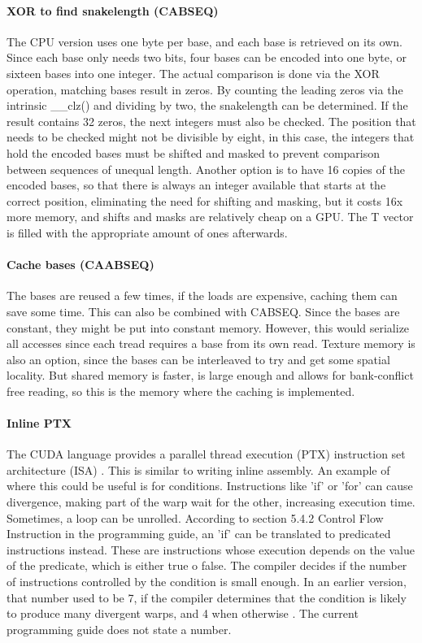 \documentclass[../main/thesis.tex]{subfiles}
\begin{document}
\paragraph{XOR to find snakelength (CABSEQ)}
The CPU version uses one byte per base, and each base is retrieved on its own.
Since each base only needs two bits, four bases can be encoded into one byte, or sixteen bases into one integer.
The actual comparison is done via the XOR operation, matching bases result in zeros.
By counting the leading zeros via the intrinsic \_\_clz() \cite{CUDA_math} and dividing by two, the snakelength can be determined.
If the result contains 32 zeros, the next integers must also be checked.
The position that needs to be checked might not be divisible by eight, in this case, the integers that hold the encoded bases must be shifted and masked to prevent comparison between sequences of unequal length.
Another option is to have 16 copies of the encoded bases, so that there is always an integer available that starts at the correct position, eliminating the need for shifting and masking, but it costs 16x more memory, and shifts and masks are relatively cheap on a GPU.
The T vector is filled with the appropriate amount of ones afterwards.

\paragraph{Cache bases (CAABSEQ)}
The bases are reused a few times, if the loads are expensive, caching them can save some time.
This can also be combined with CABSEQ.
Since the bases are constant, they might be put into constant memory.
However, this would serialize all accesses since each tread requires a base from its own read.
Texture memory is also an option, since the bases can be interleaved to try and get some spatial locality.
But shared memory is faster, is large enough and allows for bank-conflict free reading, so this is the memory where the caching is implemented.


\paragraph{Inline PTX}
The CUDA language provides a parallel thread execution (PTX) instruction set architecture (ISA) \cite{PTX1}\cite{PTX2}.
This is similar to writing inline assembly.
An example of where this could be useful is for conditions.
Instructions like 'if' or 'for' can cause divergence, making part of the warp wait for the other, increasing execution time.
Sometimes, a loop can be unrolled.
According to section 5.4.2 Control Flow Instruction in the programming guide\cite{cuda}, an 'if' can be translated to predicated instructions instead.
These are instructions whose execution depends on the value of the predicate, which is either true o false.
The compiler decides if the number of instructions controlled by the condition is small enough.
In an earlier version, that number used to be 7, if the compiler determines that the condition is likely to produce many divergent warps, and 4 when otherwise \cite{PTX3}.
The current programming guide does not state a number.
\end{document}
